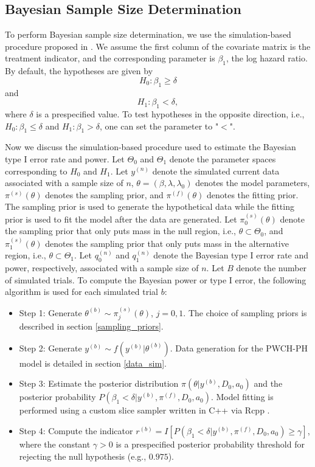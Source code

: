 
\subsection{Bayesian Sample Size Determination}

To perform Bayesian sample size determination, we use the simulation-based procedure proposed in \cite{Chen_2011}. We assume the first column of the covariate matrix is the treatment indicator,
and the corresponding parameter is $\beta_1$, the log hazard ratio. 
By default, the hypotheses are given by
$$H_0: \beta_1 \ge \delta$$ and $$H_1: \beta_1 < \delta,$$
where $\delta$ is a prespecified value. To test hypotheses in the opposite direction, i.e., $H_0: \beta_1 \le \delta$ and $H_1: \beta_1 > \delta$, one can set the parameter  to "$<$".

Now we discuss the simulation-based procedure used to estimate the Bayesian type I error rate and power. Let $\Theta_0$ and $\Theta_1$ denote the parameter spaces corresponding to $H_0$ and $H_1$. Let $y^{(n)}$ denote the simulated current data associated with a sample size of $n$, $\theta=(\beta, \lambda, \lambda_0)$ denotes the model parameters, $\pi^{(s)}(\theta)$ denotes the sampling prior, and $\pi^{(f)}(\theta)$ denotes the fitting prior. The sampling prior is used to generate the hypothetical data while the fitting prior is used to fit the model after the data are generated. Let $\pi_0^{(s)}(\theta)$ denote the sampling prior that only puts mass in the null region, i.e., $\theta \subset \Theta_0$, and $\pi_1^{(s)}(\theta)$ denotes the sampling prior that only puts mass in the alternative region, i.e., $\theta \subset \Theta_1$. Let $q_0^{(n)}$ and $q_1^{(n)}$ denote the Bayesian type I error rate and power, respectively, associated with a sample size of $n$. Let $B$ denote the number of simulated trials. To compute the 
 Bayesian power or type I error, the following algorithm is used for each simulated trial $b$:
\begin{itemize}
\item{Step 1: }{Generate $\theta^{(b)} \sim \pi_j^{(s)}(\theta)$, $j=0,1$. The choice of sampling priors is described in section \ref{sampling_priors}.}
\item{Step 2: }{Generate $y^{(b)} \sim f(y^{(b)}|\theta^{(b)})$. Data generation for the PWCH-PH model is detailed in section \ref{data_sim}.}
\item{Step 3: }{Estimate the posterior distribution $\pi(\theta|y^{(b)}, D_0, a_0)$ and the posterior probability $P(\beta_1 < \delta|y^{(b)}, \pi^{(f)},D_0, a_0)$. Model fitting is performed using a custom slice sampler written in C++ via Rcpp \citep{slice,Rcpp}}.
\item{Step 4: }{Compute the indicator $r^{(b)}=I[P(\beta_1 < \delta|y^{(b)}, \pi^{(f)}, D_0, a_0) \ge \gamma]$, where the constant $\gamma > 0$ is a prespecified posterior probability threshold for rejecting the null hypothesis (e.g., $0.975$).}
\end{itemize}

